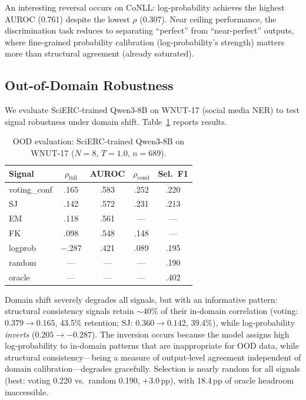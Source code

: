 \documentclass[11pt,a4paper]{article}
\begin{document}
An interesting reversal occurs on CoNLL: log-probability achieves the highest AUROC (0.761) despite the lowest $\rho$ (0.307). Near ceiling performance, the discrimination task reduces to separating ``perfect'' from ``near-perfect'' outputs, where fine-grained probability calibration (log-probability's strength) matters more than structural agreement (already saturated).

\subsection{Out-of-Domain Robustness}
\label{sec:ood}

We evaluate SciERC-trained Qwen3-8B on WNUT-17 (social media NER) to test signal robustness under domain shift. Table~\ref{tab:ood} reports results.

\begin{table}[t]
\centering
\small
\caption{OOD evaluation: SciERC-trained Qwen3-8B on WNUT-17 ($N{=}8$, $T{=}1.0$, $n{=}689$).}
\label{tab:ood}
\begin{tabular}{lcccc}
\toprule
Signal & $\rho_{\text{full}}$ & AUROC & $\rho_{\text{cond}}$ & Sel.\ F1 \\
\midrule
voting\_conf & .165 & .583 & .252 & .220 \\
SJ & .142 & .572 & .231 & .213 \\
EM & .118 & .561 & --- & --- \\
FK & .098 & .548 & .148 & --- \\
logprob & $-$.287 & .421 & .089 & .195 \\
random & --- & --- & --- & .190 \\
oracle & --- & --- & --- & .402 \\
\bottomrule
\end{tabular}
\end{table}

Domain shift severely degrades all signals, but with an informative pattern: structural consistency signals retain ${\sim}40\%$ of their in-domain correlation (voting: $0.379 \to 0.165$, 43.5\% retention; SJ: $0.360 \to 0.142$, 39.4\%), while log-probability \emph{inverts} ($0.205 \to {-}0.287$). The inversion occurs because the model assigns high log-probability to in-domain patterns that are inappropriate for OOD data, while structural consistency---being a measure of output-level agreement independent of domain calibration---degrades gracefully. Selection is nearly random for all signals (best: voting 0.220 vs.\ random 0.190, +3.0\,pp), with 18.4\,pp of oracle headroom inaccessible.
\end{document}
